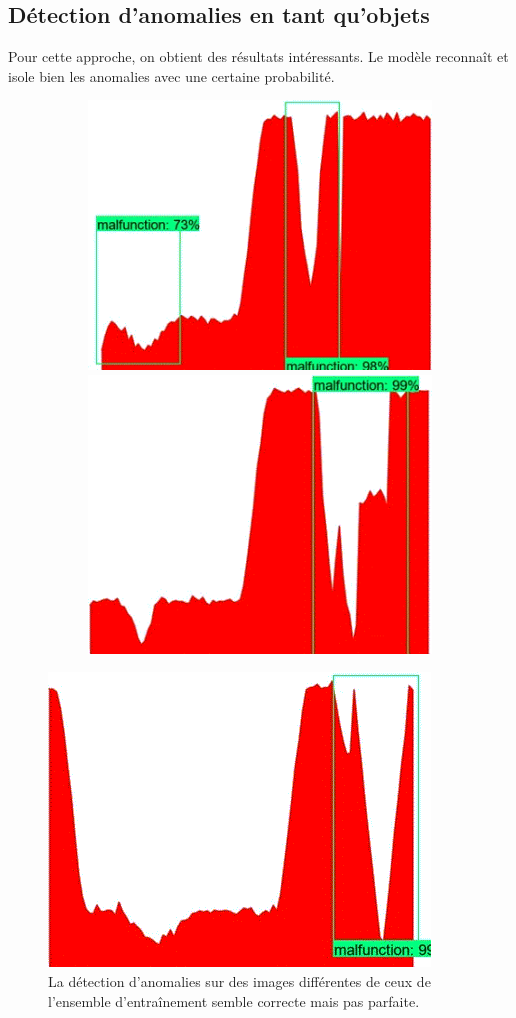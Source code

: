 \documentclass[french]{article}
\theoremstyle{mytheoremstyle}
\theoremstyle{mytheoremstyle}
\theoremstyle{myproblemstyle}
\begin{document}
        
    \subsection{Détection d'anomalies en tant qu'objets}
    Pour cette approche, on obtient des résultats intéressants. Le modèle reconnaît et isole bien les anomalies avec une certaine probabilité.
    \begin{figure}[H]
        \centering
        \begin{subfigure}{\linewidth}
            \includegraphics[width=.5\textwidth]{images/od_1.png}
            \hfill
            \includegraphics[width=.5\textwidth]{images/od_2.png}
        \end{subfigure}
    \end{figure}
    \begin{figure}[H]
        \centering
        \includegraphics[width=.5\textwidth]{images/od_3.png}
        \caption{La détection d'anomalies sur des images différentes de ceux de l'ensemble d'entraînement semble correcte mais pas parfaite.}
        \label{}
    \end{figure}
\end{document}
